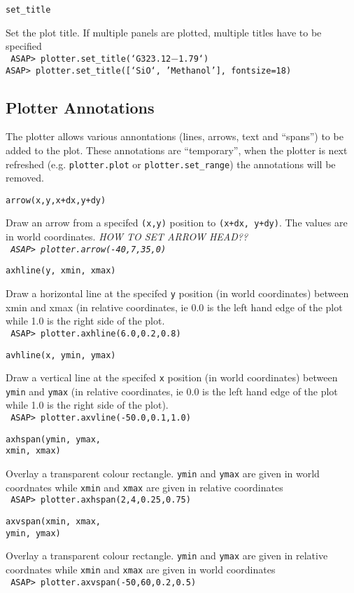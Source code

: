 \documentclass[11pt]{article}
\newcommand{\cmd}[1]{{\tt #1}}
\newcommand{\commanddef}[3]{
  \begin{minipage}[t]{27mm}\tt #1\end{minipage}\hspace{3mm}
  \begin{minipage}[t]{\textwidth-30mm}#2 \\ \tt #3\end{minipage}
}
\newcommand{\bigcommanddef}[3]{
  \begin{minipage}[t]{45mm}\tt #1\end{minipage}\hspace{3mm}
  \begin{minipage}[t]{\textwidth-47mm}#2 \\ \tt #3\end{minipage}
}
\begin{document}
\commanddef{set\_title}{Set the plot title. If multiple panels are
  plotted, multiple titles have to be specified}{
  ASAP> plotter.set\_title(`G323.12$-$1.79`)\\
  ASAP> plotter.set\_title([`SiO`, 'Methanol'], fontsize=18)\\
}

\subsection{Plotter Annotations}

The plotter allows various annontations (lines, arrows, text and
``spans'') to be added to the plot. These annotations are
``temporary'', when the plotter is next refreshed
(e.g. \cmd{plotter.plot} or \cmd{plotter.set\_range}) the annotations
will be removed. 

\bigcommanddef{arrow(x,y,x+dx,y+dy)}{Draw an arrow from a specifed
\cmd{(x,y)} position to \cmd{(x+dx, y+dy)}. The values are in world
coordinates. \em {HOW TO SET ARROW HEAD??}}{
  ASAP> plotter.arrow(-40,7,35,0)
}

\bigcommanddef{axhline(y, xmin, xmax)}{Draw a horizontal line at the
specifed \cmd{y} position (in world coordinates) between xmin and xmax
(in relative coordinates, ie 0.0 is the left hand edge of the plot
while 1.0 is the right side of the plot.}{
 ASAP> plotter.axhline(6.0,0.2,0.8)
}

\bigcommanddef{avhline(x, ymin, ymax)}{Draw a vertical line at the
specifed \cmd{x} position (in world coordinates) between \cmd{ymin}
and \cmd{ymax} (in relative coordinates, ie 0.0 is the left hand edge
of the plot while 1.0 is the right side of the plot).}{
 ASAP> plotter.axvline(-50.0,0.1,1.0)
}

\bigcommanddef{axhspan(ymin, ymax, \\ \hspace*{20mm}xmin,
 xmax)}{Overlay a transparent colour rectangle. \cmd{ymin} and
 \cmd{ymax} are given in world coordnates while \cmd{xmin} and
 \cmd{xmax} are given in relative coordinates}{ 
ASAP> plotter.axhspan(2,4,0.25,0.75) 
}

\bigcommanddef{axvspan(xmin, xmax, \\ \hspace*{20mm} ymin,
 ymax)}{Overlay a transparent colour rectangle. \cmd{ymin} and
 \cmd{ymax} are given in relative coordnates while \cmd{xmin} and
 \cmd{xmax} are given in world coordinates}{ 
ASAP> plotter.axvspan(-50,60,0.2,0.5) 
}
\end{document}
